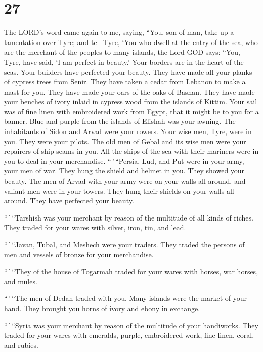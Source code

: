 \hypertarget{section-25}{%
\section{27}\label{section-25}}

 The LORD's word came again to me, saying, 
``You, son of man, take up a lamentation over Tyre;  and
tell Tyre, `You who dwell at the entry of the sea, who are the merchant
of the peoples to many islands, the Lord GOD says: ``You, Tyre, have
said, `I am perfect in beauty.'  Your borders are in the
heart of the seas. Your builders have perfected your beauty.
 They have made all your planks of cypress trees from Senir.
They have taken a cedar from Lebanon to make a mast for you.
 They have made your oars of the oaks of Bashan. They have
made your benches of ivory inlaid in cypress wood from the islands of
Kittim.  Your sail was of fine linen with embroidered work
from Egypt, that it might be to you for a banner. Blue and purple from
the islands of Elishah was your awning.  The inhabitants of
Sidon and Arvad were your rowers. Your wise men, Tyre, were in you. They
were your pilots.  The old men of Gebal and its wise men
were your repairers of ship seams in you. All the ships of the sea with
their mariners were in you to deal in your merchandise. 
``\,'\,``Persia, Lud, and Put were in your army, your men of war. They
hung the shield and helmet in you. They showed your beauty.
 The men of Arvad with your army were on your walls all
around, and valiant men were in your towers. They hung their shields on
your walls all around. They have perfected your beauty.

 ``\,'\,``Tarshish was your merchant by reason of the
multitude of all kinds of riches. They traded for your wares with
silver, iron, tin, and lead.

 ``\,'\,``Javan, Tubal, and Meshech were your traders. They
traded the persons of men and vessels of bronze for your merchandise.

 ``\,'\,``They of the house of Togarmah traded for your
wares with horses, war horses, and mules.

 ``\,'\,``The men of Dedan traded with you. Many islands
were the market of your hand. They brought you horns of ivory and ebony
in exchange.

 ``\,'\,``Syria was your merchant by reason of the
multitude of your handiworks. They traded for your wares with emeralds,
purple, embroidered work, fine linen, coral, and rubies.

